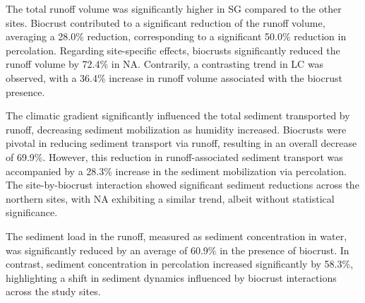 The total runoff volume was significantly higher in SG compared to the other sites. Biocrust contributed to a significant reduction of the runoff volume, averaging a 28.0\% reduction, corresponding to a significant 50.0\% reduction in percolation. Regarding site-specific effects, biocrusts significantly reduced the runoff volume by 72.4\% in NA. Contrarily, a contrasting trend in LC was observed, with a 36.4\% increase in runoff volume associated with the biocrust presence.

The climatic gradient significantly influenced the total sediment transported by runoff, decreasing sediment mobilization as humidity increased. Biocrusts were pivotal in reducing sediment transport via runoff, resulting in an overall decrease of 69.9\%. However, this reduction in runoff-associated sediment transport was accompanied by a 28.3\% increase in the sediment mobilization via percolation. The site-by-biocrust interaction showed significant sediment reductions across the northern sites, with NA exhibiting a similar trend, albeit without statistical significance.

The sediment load in the runoff, measured as sediment concentration in water, was significantly reduced by an average of 60.9\% in the presence of biocrust. In contrast, sediment concentration in percolation increased significantly by 58.3\%, highlighting a shift in sediment dynamics influenced by biocrust interactions across the study sites.

